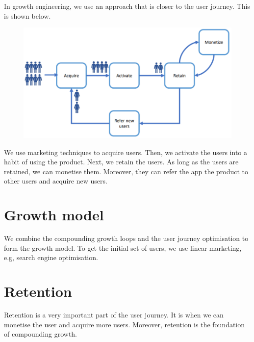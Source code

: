\documentclass[a4paper, openany]{memoir}
\begin{document}
In growth engineering, we use an approach that is closer to the user journey. This is shown below.
\begin{figure}[H]
    \centering
    \includegraphics[scale=0.5]{src/18.6 User Journey.PNG}
\end{figure}
\noindent We use marketing techniques to acquire users. Then, we activate the users into a habit of using the product. Next, we retain the users. As long as the users are retained, we can monetise them. Moreover, they can refer the app the product to other users and acquire new users.

\section{Growth model}
We combine the compounding growth loops and the user journey optimisation to form the growth model. To get the initial set of users, we use linear marketing, e.g, search engine optimisation.

\section{Retention}
Retention is a very important part of the user journey. It is when we can monetise the user and acquire more users. Moreover, retention is the foundation of compounding growth.
\end{document}
